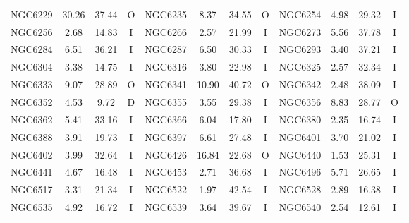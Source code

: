 \begin{table}
\begin{tabular}{l | c | c | c | l | c | c | c | l | c | c | c}
                NGC6229 &  30.26 &  37.44 &              O &
                NGC6235 &   8.37 &  34.55 &              O &
                NGC6254 &   4.98 &  29.32 &              I \\
                NGC6256 &   2.68 &  14.83 &              I &
                NGC6266 &   2.57 &  21.99 &              I &
                NGC6273 &   5.56 &  37.78 &              I \\
                NGC6284 &   6.51 &  36.21 &              I &
                NGC6287 &   6.50 &  30.33 &              I &
                NGC6293 &   3.40 &  37.21 &              I \\
                NGC6304 &   3.38 &  14.75 &              I &
                NGC6316 &   3.80 &  22.98 &              I &
                NGC6325 &   2.57 &  32.34 &              I \\
                NGC6333 &   9.07 &  28.89 &              O &
                NGC6341 &  10.90 &  40.72 &              O &
                NGC6342 &   2.48 &  38.09 &              I \\
                NGC6352 &   4.53 &   9.72 &              D &
                NGC6355 &   3.55 &  29.38 &              I &
                NGC6356 &   8.83 &  28.77 &              O \\
                NGC6362 &   5.41 &  33.16 &              I &
                NGC6366 &   6.04 &  17.80 &              I &
                NGC6380 &   2.35 &  16.74 &              I \\
                NGC6388 &   3.91 &  19.73 &              I &
                NGC6397 &   6.61 &  27.48 &              I &
                NGC6401 &   3.70 &  21.02 &              I \\
                NGC6402 &   3.99 &  32.64 &              I &
                NGC6426 &  16.84 &  22.68 &              O &
                NGC6440 &   1.53 &  25.31 &              I \\
                NGC6441 &   4.67 &  16.48 &              I &
                NGC6453 &   2.71 &  36.68 &              I &
                NGC6496 &   5.71 &  26.65 &              I \\
                NGC6517 &   3.31 &  21.34 &              I &
                NGC6522 &   1.97 &  42.54 &              I &
                NGC6528 &   2.89 &  16.38 &              I \\
                NGC6535 &   4.92 &  16.72 &              I &
                NGC6539 &   3.64 &  39.67 &              I &
                NGC6540 &   2.54 &  12.61 &              I \\

\end{tabular}
\end{table}
